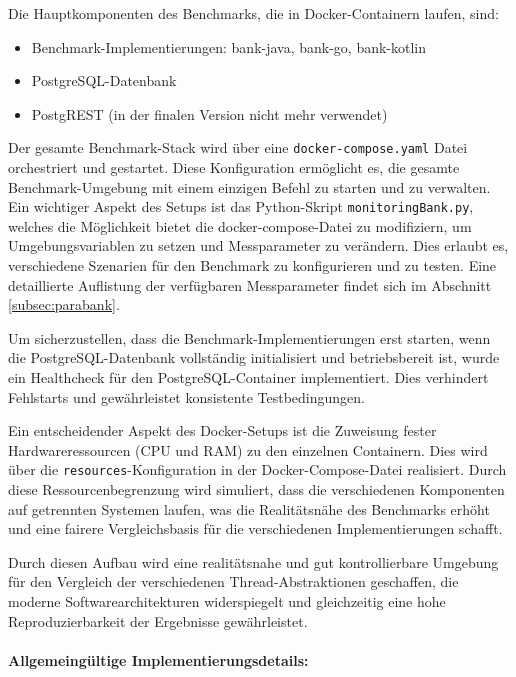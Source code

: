 \documentclass[fontsize=12pt,paper=a4,twoside=semi,parskip=half-,headsepline,headinclude]{scrreprt}
\begin{document}
Die Hauptkomponenten des Benchmarks, die in Docker-Containern laufen, sind:

\begin{itemize}
	\item Benchmark-Implementierungen: bank-java, bank-go, bank-kotlin
	\item PostgreSQL-Datenbank
	\item PostgREST (in der finalen Version nicht mehr verwendet)
\end{itemize}

Der gesamte Benchmark-Stack wird über eine \texttt{docker-compose.yaml} Datei orchestriert und gestartet. Diese Konfiguration ermöglicht es, die gesamte Benchmark-Umgebung mit einem einzigen Befehl zu starten und zu verwalten.
Ein wichtiger Aspekt des Setups ist das Python-Skript \texttt{monitoringBank.py}, welches die Möglichkeit bietet die docker-compose-Datei zu modifiziern, um Umgebungsvariablen zu setzen und Messparameter zu verändern. Dies erlaubt es, verschiedene Szenarien für den Benchmark zu konfigurieren und zu testen. Eine detaillierte Auflistung der verfügbaren Messparameter findet sich im Abschnitt \ref{subsec:parabank}.

Um sicherzustellen, dass die Benchmark-Implementierungen erst starten, wenn die Post\-greSQL-Datenbank vollständig initialisiert und betriebsbereit ist, wurde ein Healthcheck für den PostgreSQL-Container implementiert. Dies verhindert Fehlstarts und ge\-währ\-leis\-tet konsistente Testbedingungen.

Ein entscheidender Aspekt des Docker-Setups ist die Zuweisung fester Hardwareressourcen (CPU und RAM) zu den einzelnen Containern. Dies wird über die \texttt{resources}-Konfiguration in der Docker-Compose-Datei realisiert. Durch diese Ressourcenbegrenzung wird simuliert, dass die verschiedenen Komponenten auf getrennten Systemen laufen, was die Realitätsnähe des Benchmarks erhöht und eine fairere Vergleichsbasis für die verschiedenen Implementierungen schafft.

Durch diesen Aufbau wird eine realitätsnahe und gut kontrollierbare Umgebung für den Vergleich der verschiedenen Thread-Abstraktionen geschaffen, die moderne Softwarearchitekturen widerspiegelt und gleichzeitig eine hohe Reproduzierbarkeit der Ergebnisse gewährleistet.

\paragraph{Allgemeingültige Implementierungsdetails:}
\end{document}
